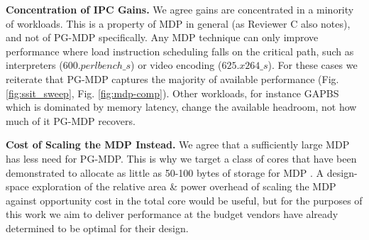  \textbf{Concentration of IPC Gains.} We agree gains are concentrated in a minority of workloads. This is a property of MDP in general (as Reviewer C also notes), and not of PG-MDP specifically. Any MDP technique can only improve performance where load instruction scheduling falls on the critical path, such as interpreters ($600.perlbench\_s$) or video encoding ($625.x264\_s$). For these cases we reiterate that PG-MDP captures the majority of available performance (Fig. \ref{fig:ssit_sweep}, Fig. \ref{fig:mdp-comp}). Other workloads, for instance GAPBS \cite{gapbs} which is dominated by memory latency, change the available headroom, not how much of it PG-MDP recovers.

 \textbf{Cost of Scaling the MDP Instead.} We agree that a sufficiently large MDP has less need for PG-MDP. This is why we target a class of cores that have been demonstrated to allocate as little as 50-100 bytes of storage for MDP \cite{ssbench}. A design-space exploration of the relative area \& power overhead of scaling the MDP against opportunity cost in the total core would be useful, but for the purposes of this work we aim to deliver performance at the budget vendors have already determined to be optimal for their design.

\clearpage
